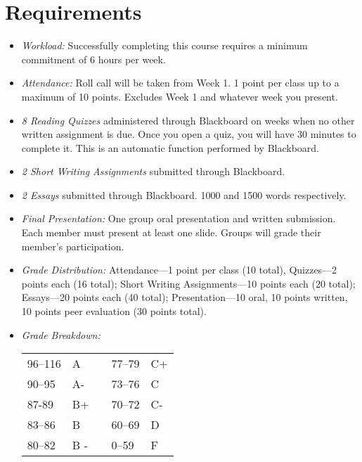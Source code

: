 \documentclass[11pt,article,oneside]{memoir}
\begin{document}
\section{Requirements}

\begin{itemize}
\item \textit{Workload:} Successfully completing this course requires a minimum commitment of 6 hours per week. 

\item \textit{Attendance:} Roll call will be taken from Week 1. 1 point per class up to a maximum of 10 points. Excludes Week 1 and whatever week you present.

\item \textit{8 Reading Quizzes} administered through Blackboard on weeks when no other written assignment is due. Once you open a quiz, you will have 30 minutes to complete it. This is an automatic function performed by Blackboard. 

\item \textit{2 Short Writing Assignments} submitted through Blackboard. 

\item \textit{2 Essays} submitted through Blackboard. 1000 and 1500 words respectively.

\item \textit{Final Presentation:} One group oral presentation and written submission. Each member must present at least one slide. Groups will grade their member's participation. 

\item \textit{Grade Distribution:}  Attendance---1 point per class (10 total), Quizzes---2 points each (16 total);  Short Writing Assignments---10 points each (20 total); Essays---20 points each (40 total); Presentation---10 oral, 10 points written, 10 points peer evaluation (30 points total).

\item \textit{Grade Breakdown:}

 \begin{tabular}{ | l | l | p{2cm} | l | l | }
    \hline 
96--116 & A  & &  77--79 &  C+ \\  
90--95 & A- & &  73--76 & C \\
87-89 & B+ &  &  70--72 & C- \\ 
83--86 & B  & &  60--69 & D\\
80--82 & B - & & 0--59 & F\\ \hline
    \end{tabular}


\end{itemize}
\end{document}
